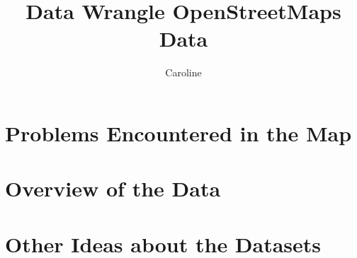 \documentclass{article}
\author{Caroline}
\title{Data Wrangle OpenStreetMaps Data}
\begin{document}
    \maketitle
    \section{Problems Encountered in the Map}
    \section{Overview of the Data}
    \section{Other Ideas about the Datasets}
\end{document}
